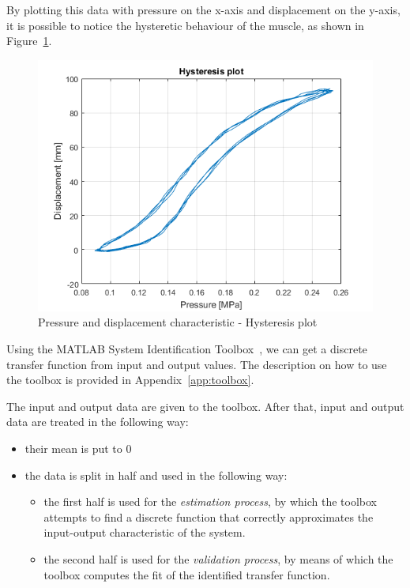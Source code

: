 By plotting this data with pressure on the x-axis and displacement on the y-axis,
it is possible to notice the hysteretic behaviour of the muscle,
as shown in Figure~\ref{fig:hysteresis_plot}.

\begin{figure}[]
	\centering
	\includegraphics[width=\linewidth]{"Images/hysteresis_plot"}
	\caption[Pressure and displacement characteristic]{Pressure and displacement characteristic - Hysteresis plot}
	\label{fig:hysteresis_plot}
\end{figure}

Using the MATLAB System Identification Toolbox~\cite{ide_toolbox},
we can get a discrete transfer function from input and output values.
The description on how to use the toolbox is provided in Appendix~\ref{app:toolbox}.

The input and output data are given to the toolbox. 
After that, input and output data are treated in the following way:
\begin{itemize}
	\item their mean is put to 0
	\item the data is split in half and used in the following way:
	\begin{itemize}
		\item the first half is used for the \textit{estimation process},
		by which the toolbox attempts to find a discrete function
		that correctly approximates the input-output characteristic of the system.
		\item the second half is used for the \textit{validation process},
		by means of which the toolbox computes the fit of the identified transfer function.
	\end{itemize}
\end{itemize}  

